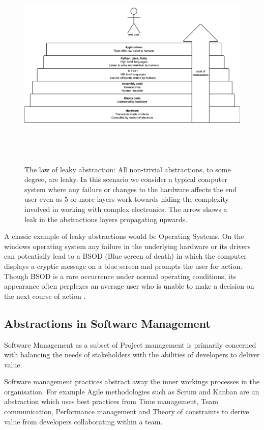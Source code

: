 \documentclass[12pt,conference]{IEEEtran}
\begin{document}
\begin{figure}
  \centering
  \includegraphics[height=4in]{leakyabstraction}
  \caption{The law of leaky abstraction: All non-trivial abstractions, to some degree, are leaky. In this scenario we consider a typical computer system where any failure or changes to the hardware affects the end user even as 5 or more layers work towards hiding the complexity involved in working with complex electronics. The arrow shows a leak in the abstractions layers propagating upwards.}
  \label{leakyabstraction}
\end{figure}

A classic example of leaky abstractions would be Operating Systems. On the windows operating system any failure in the underlying hardware or its drivers can potentially lead to a BSOD (Blue screen of death) in which the computer displays a cryptic message on a blue screen and prompts the user for action. Though BSOD is a rare occurrence under normal operating conditions, its appearance often perplexes an average user who is unable to make a decision on the next course of action \cite{rosenberg_law_2007}. 

\subsection*{Abstractions in Software Management}

Software Management as a subset of Project management is primarily concerned with balancing the needs of stakeholders with the abilities of developers to deliver value.

Software management practices abstract away the inner workings processes in the organisation. For example Agile methodologies such as Scrum and Kanban are an abstraction which uses best practices from Time management, Team communication, Performance management and Theory of constraints to derive value from developers collaborating within a team. 
\end{document}
